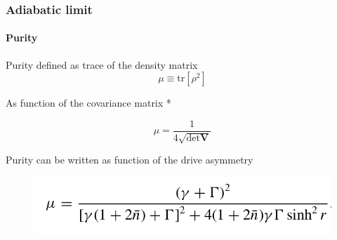 \documentclass[aspectratio=43]{beamer}
\begin{document}
\begin{frame}
	
	\frametitle{Adiabatic limit}
	\framesubtitle{Purity}
	
	Purity defined as trace of the density matrix
	\begin{equation}
		\mu \equiv \textrm{tr}[\rho^{2}] \nonumber
	\end{equation}	
		
	As function of the covariance matrix {\color{blue}*}
	
	\begin{equation}
		\mu = \frac{1}{4 \sqrt{\det \textbf{V}}} \nonumber
	\end{equation}
	
	Purity can be written as function of the drive asymmetry 
	
	\begin{figure}
		\includegraphics[width = 6.75 cm]{plots/purity.png}
	\end{figure}

\end{frame}
\end{document}
